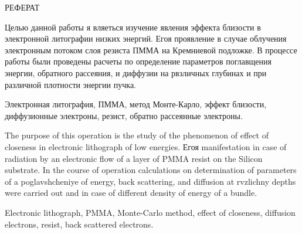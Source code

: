 \begin{center}
РЕФЕРАТ
\end{center}
Целью данной работы я вляеться изучение явления эффекта близости в электронной литографии низких энергий.
Егоя проявление в случае облучения электронным потоком слоя резиста ПММА на Кремниевой подложке. В процессе работы были проведены расчеты по определение параметров поглавщения энергии, обратного рассеяния, и диффузии на рвзличных глубинах и при различной плотности энергии пучка.
\vspace*{1cm}

Электронная литография, ПММА, метод Монте-Карло, эффект близости, диффузионные электроны, резист, обратно рассеянные электроны.
 \vspace*{1cm}

The purpose of this operation is the study of the phenomenon of effect of closeness in electronic lithograph of low energies.
Егоя manifestation in case of radiation by an electronic flow of a layer of PMMA resist on the Silicon substrate. In the course of operation calculations on determination of parameters of a poglavshcheniye of energy, back scattering, and diffusion at rvzlichny depths were carried out and in case of different density of energy of a bundle.
\vspace*{1cm}

Electronic lithograph, PMMA, Monte-Carlo method, effect of closeness, diffusion electrons, resist, back scattered electrons.

